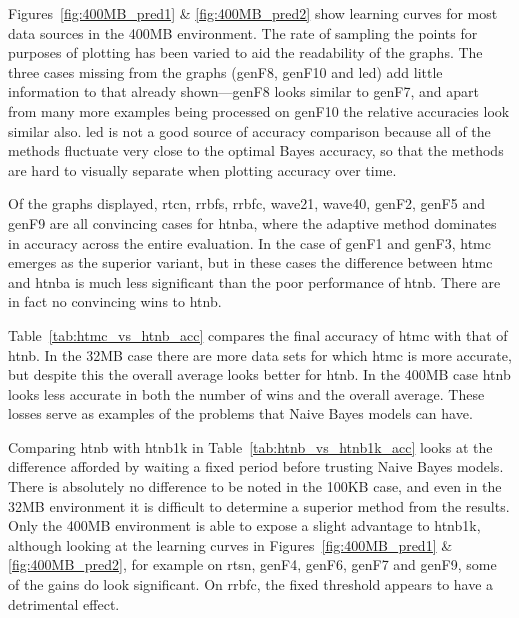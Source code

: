 Figures~\ref{fig:400MB_pred1} \& \ref{fig:400MB_pred2} show learning curves for most data sources in the 400MB environment. The rate of sampling the points for purposes of plotting has been varied to aid the readability of the graphs. The three cases missing from the graphs ({\sc genF8}, {\sc genF10} and {\sc led}) add little information to that already shown---{\sc genF8} looks similar to {\sc genF7}, and apart from many more examples being processed on {\sc genF10} the relative accuracies look similar also. {\sc led} is not a good source of accuracy comparison because all of the methods fluctuate very close to the optimal Bayes accuracy, so that the methods are hard to visually separate when plotting accuracy over time.

Of the graphs displayed, {\sc rtcn}, {\sc rrbfs}, {\sc rrbfc}, {\sc wave21}, {\sc wave40}, {\sc genF2}, {\sc genF5} and {\sc genF9} are all convincing cases for {\sc htnba}, where the adaptive method dominates in accuracy across the entire evaluation. In the case of {\sc genF1} and {\sc genF3}, {\sc htmc} emerges as the superior variant, but in these cases the difference between {\sc htmc} and {\sc htnba} is much less significant than the poor performance of {\sc htnb}. There are in fact no convincing wins to {\sc htnb}.

Table~\ref{tab:htmc_vs_htnb_acc} compares the final accuracy of {\sc htmc} with that of {\sc htnb}. In the 32MB case there are more data sets for which {\sc htmc} is more accurate, but despite this the overall average looks better for {\sc htnb}. In the 400MB case {\sc htnb} looks less accurate in both the number of wins and the overall average. These losses serve as examples of the problems that Naive Bayes models can have.

Comparing {\sc htnb} with {\sc htnb1k} in Table~\ref{tab:htnb_vs_htnb1k_acc} looks at the difference afforded by waiting a fixed period before trusting Naive Bayes models. There is absolutely no difference to be noted in the 100KB case, and even in the 32MB environment it is difficult to determine a superior method from the results. Only the 400MB environment is able to expose a slight advantage to {\sc htnb1k}, although looking at the learning curves in Figures~\ref{fig:400MB_pred1} \& \ref{fig:400MB_pred2}, for example on {\sc rtsn}, {\sc genF4}, {\sc genF6}, {\sc genF7} and {\sc genF9}, some of the gains do look significant. On {\sc rrbfc}, the fixed threshold appears to have a detrimental effect.


